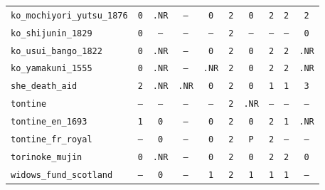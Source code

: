 \documentclass[11pt,a4paper]{article}
\begin{document}
\begin{table}[htbp]
\begin{tabular}{lccccccccc}
\texttt{ko\_mochiyori\_yutsu\_1876} & \texttt{0} & \texttt{.NR} & \texttt{--} & \texttt{0} & \texttt{2} & \texttt{0} & \texttt{2} & \texttt{2} & \texttt{2} \\
\texttt{ko\_shijunin\_1829} & \texttt{0} & \texttt{--} & \texttt{--} & \texttt{--} & \texttt{2} & \texttt{--} & \texttt{--} & \texttt{--} & \texttt{0} \\
\texttt{ko\_usui\_bango\_1822} & \texttt{0} & \texttt{.NR} & \texttt{--} & \texttt{0} & \texttt{2} & \texttt{0} & \texttt{2} & \texttt{2} & \texttt{.NR} \\
\texttt{ko\_yamakuni\_1555} & \texttt{0} & \texttt{.NR} & \texttt{--} & \texttt{.NR} & \texttt{2} & \texttt{0} & \texttt{2} & \texttt{2} & \texttt{.NR} \\
\texttt{she\_death\_aid} & \texttt{2} & \texttt{.NR} & \texttt{.NR} & \texttt{0} & \texttt{2} & \texttt{0} & \texttt{1} & \texttt{1} & \texttt{3} \\
\texttt{tontine} & \texttt{--} & \texttt{--} & \texttt{--} & \texttt{--} & \texttt{2} & \texttt{.NR} & \texttt{--} & \texttt{--} & \texttt{--} \\
\texttt{tontine\_en\_1693} & \texttt{1} & \texttt{0} & \texttt{--} & \texttt{0} & \texttt{2} & \texttt{0} & \texttt{2} & \texttt{1} & \texttt{.NR} \\
\texttt{tontine\_fr\_royal} & \texttt{--} & \texttt{0} & \texttt{--} & \texttt{0} & \texttt{2} & \texttt{P} & \texttt{2} & \texttt{--} & \texttt{--} \\
\texttt{torinoke\_mujin} & \texttt{0} & \texttt{.NR} & \texttt{--} & \texttt{0} & \texttt{2} & \texttt{0} & \texttt{2} & \texttt{2} & \texttt{0} \\
\texttt{widows\_fund\_scotland} & \texttt{--} & \texttt{0} & \texttt{--} & \texttt{1} & \texttt{2} & \texttt{1} & \texttt{1} & \texttt{1} & \texttt{--} \\
\bottomrule\end{tabular}\end{table}
\end{document}
